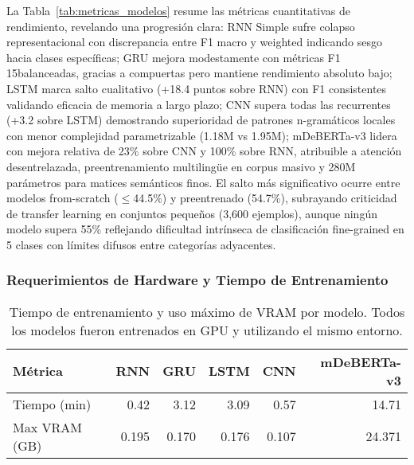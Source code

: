 \documentclass[paper=letter, fontsize=11pt, draft=false]{scrartcl}
\numberwithin{equation}{section} %
\numberwithin{figure}{section} %
\numberwithin{table}{section} %
\numberwithin{subsection}{section}
\begin{document}
La Tabla~\ref{tab:metricas_modelos} resume las métricas cuantitativas de rendimiento, revelando una progresión clara: RNN Simple sufre colapso representacional con discrepancia entre F1 macro y weighted indicando sesgo hacia clases específicas; GRU mejora modestamente con métricas F1 15balanceadas, gracias a compuertas pero mantiene rendimiento absoluto bajo; LSTM marca salto cualitativo (+18.4 puntos sobre RNN) con F1 consistentes validando eficacia de memoria a largo plazo; CNN supera todas las recurrentes (+3.2 sobre LSTM) demostrando superioridad de patrones n-gramáticos locales con menor complejidad parametrizable (1.18M vs 1.95M); mDeBERTa-v3 lidera con mejora relativa de 23\% sobre CNN y 100\% sobre RNN, atribuible a atención desentrelazada, preentrenamiento multilingüe en corpus masivo y 280M parámetros para matices semánticos finos. El salto más significativo ocurre entre modelos from-scratch ($\leq$44.5\%) y preentrenado (54.7\%), subrayando criticidad de transfer learning en conjuntos pequeños (3,600 ejemplos), aunque ningún modelo supera 55\% reflejando dificultad intrínseca de clasificación fine-grained en 5 clases con límites difusos entre categorías adyacentes.


\subsubsection{Requerimientos de Hardware y Tiempo de Entrenamiento}

\begin{table}[H]
\centering
\begin{tabular}{lrrrrr}
\toprule
\textbf{Métrica} & \textbf{RNN} & \textbf{GRU} & \textbf{LSTM} & \textbf{CNN} & \textbf{mDeBERTa-v3} \\
\midrule
Tiempo (min) & 0.42 & 3.12 & 3.09 & 0.57 & 14.71 \\
Max VRAM (GB) & 0.195 & 0.170 & 0.176 & 0.107 & 24.371 \\
\bottomrule
\end{tabular}
\caption{Tiempo de entrenamiento y uso máximo de VRAM por modelo. Todos los modelos fueron entrenados en GPU y utilizando el mismo entorno.}
\label{tab:hardware_tiempo}
\end{table}
\end{document}
